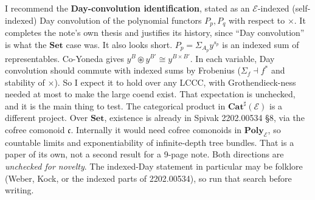 \documentclass[10pt]{amsart}
\newcommand{\Poly}{\mathbf{Poly}}
\newcommand{\Cat}{\mathbf{Cat}}
\newcommand{\Set}{\mathbf{Set}}
\newcommand{\E}{\mathcal{E}}
\begin{document}
I recommend the \textbf{Day-convolution identification}, stated as an $\E$-indexed (self-indexed) Day convolution
of the polynomial functors $P_p,P_q$ with respect to $\times$. It completes the note's own thesis and justifies its
history, since ``Day convolution'' is what the $\Set$ case was. It also looks short. $P_p=\Sigma_{A_p}y^{s_p}$ is an
indexed sum of representables. Co-Yoneda gives $y^{B}\circledast y^{B'}\cong y^{B\times B'}$. In each variable, Day
convolution should commute with indexed sums by Frobenius ($\Sigma_f\dashv f^*$ and stability of $\times$). So I expect
it to hold over any LCCC, with Grothendieck-ness needed at most to make the large coend exist. That expectation is
unchecked, and it is the main thing to test. The categorical product in $\Cat^\sharp(\E)$ is a different project.
Over $\Set$, existence is already in Spivak 2202.00534 \S8, via the cofree comonoid $\mathfrak c$. Internally it would
need cofree comonoids in $\Poly_\E$, so countable limits and exponentiability of infinite-depth tree bundles. That is
a paper of its own, not a second result for a 9-page note. Both directions are \emph{unchecked for novelty}. The
indexed-Day statement in particular may be folklore (Weber, Kock, or the indexed parts of 2202.00534), so run that
search before writing.
\end{document}
